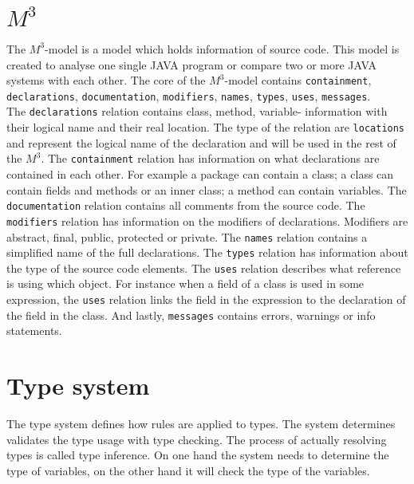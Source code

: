 \documentclass[../main.tex]{subfiles}
\begin{document}
    \section{$M^3$}
    The $M^3$-model is a model which holds information of source code\cite{Ana:13}.
    This model is created to analyse one single JAVA program or compare two or more JAVA systems with each other.
    The core of the $M^3$-model contains \texttt{containment}, \texttt{declarations}, \texttt{documentation}, \texttt{modifiers}, \texttt{names}, \texttt{types}, \texttt{uses}, \texttt{messages}.
    \\
    The \texttt{declarations} relation contains class, method, variable- information with their logical name and their real location. The type of the relation are \texttt{locations} and represent the logical name of the declaration and will be used in the rest of the $M^3$.
    The \texttt{containment} relation has information on what declarations are contained in each other. For example a package can contain a class; a class can contain fields and methods or an inner class; a method can contain variables.    
    The \texttt{documentation} relation contains all comments from the source code. 
    The \texttt{modifiers} relation has information on the modifiers of declarations. Modifiers are abstract, final, public, protected or private.
    The \texttt{names} relation contains a simplified name of the full declarations.
    The \texttt{types} relation has information about the type of the source code elements.
    The \texttt{uses} relation describes what reference is using which object. For instance when a field of a class is used in some expression, the \texttt{uses} relation links the field in the expression to the declaration of the field in the class.
    And lastly, \texttt{messages} contains errors, warnings or info statements.
    
    \section{Type system}
    The type system defines how rules are applied to types.
    The system determines validates the type usage with type checking.
    The process of actually resolving types is called type inference.
    On one hand the system needs to determine the type of variables, on the other hand it will check the type of the variables.
\end{document}
